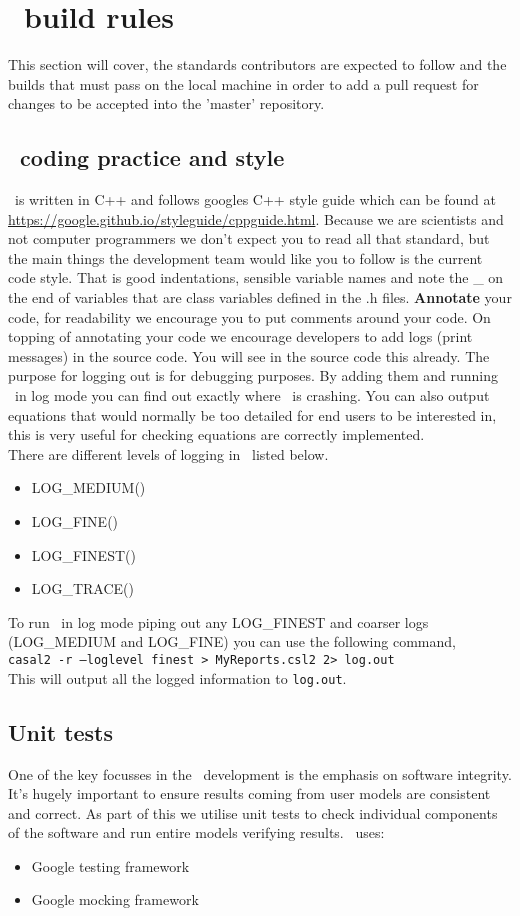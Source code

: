 \section{\CNAME\ build rules\label{sec:build_rules}}
This section will cover, the standards contributors are expected to follow and the builds that must pass on the local machine in order to add a pull request for changes to be accepted into the 'master' repository.

\subsection{\CNAME\ coding practice and style}
\CNAME\ is written in C++ and follows googles C++ style guide which can be found at \url{https://google.github.io/styleguide/cppguide.html}. Because we are scientists and not computer programmers we don't expect you to read all that standard, but the main things the development team would like you to follow is the current code style. That is good indentations, sensible variable names and note the \_ on the end of variables that are class variables defined in the .h files. \textbf{Annotate} your code, for readability we encourage you to put comments around your code. On topping of annotating your code we encourage developers to add logs (print messages) in the source code. You will see in the source code this already. The purpose for logging out is for debugging purposes. By adding them and running \CNAME\ in log mode you can find out exactly where \CNAME\ is crashing. You can also output equations that would normally be too detailed for end users to be interested in, this is very useful for checking equations are correctly implemented.
\\
There are different levels of logging in \CNAME\ listed below.
\begin{itemize}
	\item LOG\_MEDIUM() 
	\item LOG\_FINE() 
	\item LOG\_FINEST() 
	\item LOG\_TRACE() 
\end{itemize}

To run \CNAME\ in log mode piping out any LOG\_FINEST and coarser logs (LOG\_MEDIUM and LOG\_FINE) you can use the following command,
\\
\texttt{casal2 -r --loglevel finest > MyReports.csl2 2> log.out}
\\
This will output all the logged information to \texttt{log.out}.
\subsection{Unit tests}
One of the key focusses in the \CNAME\ development is the emphasis on software integrity. It's hugely important to ensure results coming from user models are consistent and correct. As part of this we utilise unit tests to check individual components of the software and run entire models verifying results.
\CNAME\ uses:
\begin{itemize}
	\item Google testing framework
	\item Google mocking framework
\end{itemize}

